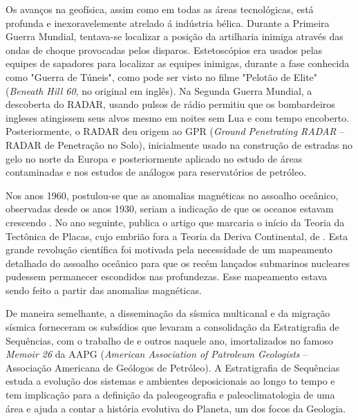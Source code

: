 \documentclass[a4paper,11pt]{scrbook}
\begin{document}
Os avan\c{c}os na geof\'isica, assim como em todas as \'areas tecnol\'ogicas, est\'a profunda e inexoravelemente atrelado \'a ind\'ustria b\'elica.
Durante a Primeira Guerra Mundial, tentava-se localizar a posi\c{c}\~ao da artilharia inimiga atrav\'es das ondas de choque provocadas pelos disparos.
Estetosc\'opios era usados pelas equipes de sapadores para localizar as equipes inimigas, durante a fase conhecida como "Guerra de T\'uneis", como pode ser visto no filme "Pelot\~ao de Elite" \citep{sims_2010} (\emph{Beneath Hill 60}, no original em ingl\^es).
Na Segunda Guerra Mundial, a descoberta do RADAR, usando pulsos de r\'adio permitiu que os bombardeiros ingleses atingissem seus alvos mesmo em noites sem Lua e com tempo encoberto.
Posteriormente, o RADAR deu origem ao GPR (\emph{Ground Penetrating RADAR} -- RADAR de Penetra\c{c}\~ao no Solo), inicialmente usado na constru\c{c}\~ao de estradas no gelo no norte da Europa e posteriormente aplicado no estudo de \'areas contaminadas e nos estudos de an\'alogos para reservat\'orios de petr\'oleo.

Nos anos 1960, postulou-se que as anomalias magn\'eticas no assoalho oce\^anico, observadas desde os anos 1930, seriam a indica\c{c}\~ao de que os oceanos estavam crescendo \citep{vine_1965}. 
No ano seguinte, \citeauthor{wilson_1966} publica o artigo que marcaria o in\'icio da Teoria da Tect\^onica de Placas, cujo embri\~ao fora a Teoria da Deriva Continental, de \citet{van_der_gracht_theory_1928}.
Esta grande revolu\c{c}\~ao cient\'ifica foi motivada pela necessidade de um mapeamento detalhado do assoalho oce\^anico para que os rec\'em lan\c{c}ados submarinos nucleares pudessem permanecer escondidos nas profundezas.
Esse mapeamento estava sendo feito a partir das anomalias magn\'eticas.

De maneira semelhante, a dissemina\c{c}\~ao da s\'ismica multicanal e da migra\c{c}\~ao s\'ismica forneceram os subs\'idios que levaram a consolida\c{c}\~ao da Estratigrafia de Sequ\^encias, com o trabalho de \citeauthor{mitchum_seismic_1977} e outros naquele ano, imortalizados no famoso \emph{Memoir 26} da AAPG (\emph{American Association of Patroleum Geologists} -- Associa\c{c}\~ao Americana de Ge\'ologos de Petr\'oleo).
A Estratigrafia de Sequ\^encias estuda a evolu\c{c}\~ao dos sistemas e ambientes deposicionais ao longo to tempo e tem implica\c{c}\~ao para a defini\c{c}\~ao da paleogeografia e paleoclimatologia de uma \'area e ajuda a contar a hist\'oria evolutiva do Planeta, um dos focos da Geologia.
\end{document}
